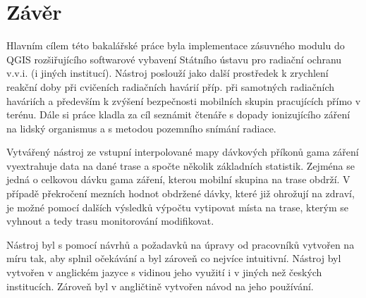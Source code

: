 \chapter{Závěr}
\label{5-zaver}

Hlavním cílem této bakalářské práce byla implementace zásuvného modulu do QGIS rozšiřujícího softwarové vybavení Státního ústavu pro radiační ochranu v.v.i. (i jiných institucí). Nástroj poslouží jako další prostředek k zrychlení reakční doby při cvičeních radiačních havárií příp. při samotných radiačních haváriích a především k zvýšení bezpečnosti mobilních skupin pracujících přímo v terénu. Dále si práce kladla za cíl seznámit čtenáře s dopady ionizujícího záření na lidský organismus a s metodou pozemního snímání radiace. 

Vytvářený nástroj ze vstupní interpolované mapy dávkových příkonů gama záření vyextrahuje data na dané trase a spočte několik základních statistik. Zejména se jedná o celkovou dávku gama záření, kterou mobilní skupina na trase obdrží. V případě překročení mezních hodnot obdržené dávky, které již ohrožují na zdraví, je možné pomocí dalších výsledků výpočtu vytipovat místa na trase, kterým se vyhnout a tedy trasu monitorování modifikovat. 

Nástroj byl s pomocí návrhů a požadavků na úpravy od pracovníků  vytvořen na míru tak, aby splnil očekávání a byl zároveň co nejvíce intuitivní. Nástroj byl vytvořen v anglickém jazyce s vidinou jeho využití i v jiných než českých institucích. Zároveň byl v angličtině vytvořen návod na jeho používání. 





 



